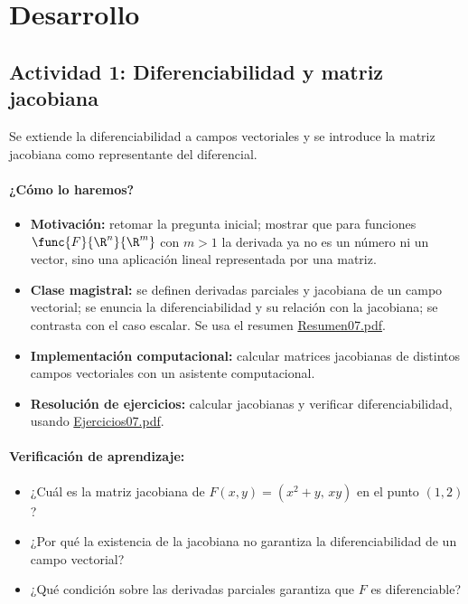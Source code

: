 \documentclass[a4,11pt]{aleph-notas}
\begin{document}
\section*{Desarrollo}

\subsection*{Actividad 1: Diferenciabilidad y matriz jacobiana}
Se extiende la diferenciabilidad a campos vectoriales y se introduce la matriz jacobiana como representante del diferencial.

\paragraph{¿Cómo lo haremos?}
\begin{itemize}[leftmargin=*]
    \item \textbf{Motivación:} retomar la pregunta inicial; mostrar que para funciones $\func{F}{\R^n}{\R^m}$ con $m>1$ la derivada ya no es un número ni un vector, sino una aplicación lineal representada por una matriz.
    \item \textbf{Clase magistral:} se definen derivadas parciales y jacobiana de un campo vectorial; se enuncia la diferenciabilidad y su relación con la jacobiana; se contrasta con el caso escalar. Se usa el resumen \href{https://andres-merino.github.io/MatematicaIII-05-N0051/01Resumen/Resumen07.pdf}{Resumen07.pdf}.
    \item \textbf{Implementación computacional:} calcular matrices jacobianas de distintos campos vectoriales con un asistente computacional.
    \item \textbf{Resolución de ejercicios:} calcular jacobianas y verificar diferenciabilidad, usando \href{https://andres-merino.github.io/MatematicaIII-05-N0051/04Ejercicios/Ejercicios07.pdf}{Ejercicios07.pdf}.
\end{itemize}

\paragraph{Verificación de aprendizaje:}
\begin{itemize}[leftmargin=*]
    \item ¿Cuál es la matriz jacobiana de $F(x,y)=(x^2+y,\, xy)$ en el punto $(1,2)$?
    \item ¿Por qué la existencia de la jacobiana no garantiza la diferenciabilidad de un campo vectorial?
    \item ¿Qué condición sobre las derivadas parciales garantiza que $F$ es diferenciable?
\end{itemize}
\end{document}
